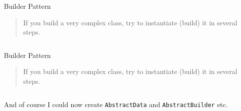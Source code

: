 \begin{frame}[t]{Builder Pattern}
	\begin{quote}
		If you build a very complex class, try to instantiate (build) it in several steps.
	\end{quote}
	
	\inputminted[]{python}{code/patterns/creational/builder_good.py}
\end{frame} 

\begin{frame}[t]{Builder Pattern}
	\begin{quote}
		If you build a very complex class, try to instantiate (build) it in several steps.
	\end{quote}
	
	\inputminted{python}{code/patterns/creational/builder_best.py}
	And of course I could now create \texttt{AbstractData} and \texttt{AbstractBuilder} etc.
\end{frame} 
